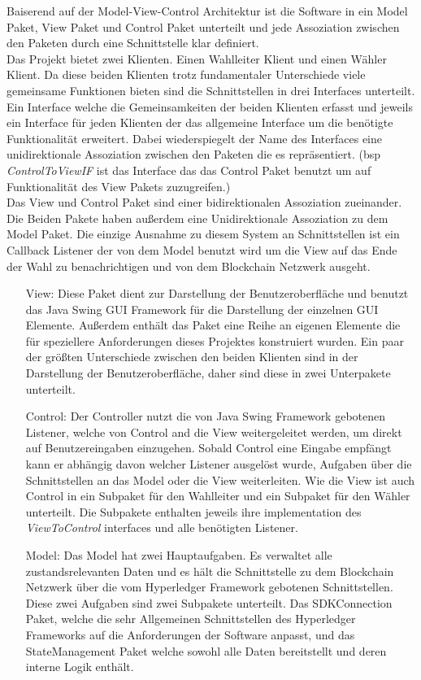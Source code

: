 \documentclass[parskip=full]{scrartcl}
\begin{document}
	Baiserend auf der Model-View-Control Architektur ist die Software in ein Model Paket, View Paket und Control Paket unterteilt und jede Assoziation zwischen den Paketen durch eine Schnittstelle klar definiert. 
	\\
	Das Projekt bietet zwei Klienten. Einen Wahlleiter Klient und einen Wähler Klient. Da diese beiden Klienten trotz fundamentaler Unterschiede viele gemeinsame Funktionen bieten sind die Schnittstellen in drei Interfaces unterteilt. Ein Interface welche die Gemeinsamkeiten der beiden Klienten erfasst und jeweils ein Interface für jeden Klienten der das allgemeine Interface um die benötigte Funktionalität erweitert. Dabei wiederspiegelt der Name des Interfaces eine unidirektionale Assoziation zwischen den Paketen die es repräsentiert. (bsp \textit{ControlToViewIF} ist das Interface das das Control Paket benutzt um auf Funktionalität des View Pakets zuzugreifen.)
	\\
	Das View und Control Paket sind einer bidirektionalen Assoziation zueinander. Die Beiden Pakete haben außerdem eine Unidirektionale Assoziation zu dem Model Paket. Die einzige Ausnahme zu diesem System an Schnittstellen ist ein Callback Listener der von dem Model benutzt wird um die View auf das Ende der Wahl zu benachrichtigen und von dem Blockchain Netzwerk ausgeht.
	\\
	\begin{itemize}
		\item[View:] Diese Paket dient zur Darstellung der Benutzeroberfläche und benutzt das Java Swing GUI Framework für die Darstellung der einzelnen GUI Elemente. Außerdem enthält das Paket eine Reihe an eigenen Elemente die für speziellere Anforderungen dieses Projektes konstruiert wurden. Ein paar der größten Unterschiede zwischen den beiden Klienten sind in der Darstellung der Benutzeroberfläche, daher sind diese in zwei Unterpakete unterteilt.
		\item[Control:] Der Controller nutzt die von Java Swing Framework gebotenen Listener, welche von Control and die View weitergeleitet werden, um direkt auf Benutzereingaben einzugehen. Sobald Control eine Eingabe empfängt kann er abhängig davon welcher Listener ausgelöst wurde, Aufgaben über die Schnittstellen an das Model oder die View weiterleiten. Wie die View ist auch Control in ein Subpaket für den Wahlleiter und ein Subpaket für den Wähler unterteilt. Die Subpakete enthalten jeweils ihre implementation des \textit{ViewToControl} interfaces und alle benötigten Listener.
		\item[Model:] Das Model hat zwei Hauptaufgaben. Es verwaltet alle zustandsrelevanten Daten und es hält die Schnittstelle zu dem Blockchain Netzwerk über die vom Hyperledger Framework gebotenen Schnittstellen. Diese zwei Aufgaben sind zwei Subpakete unterteilt. Das SDKConnection Paket, welche die sehr Allgemeinen Schnittstellen des Hyperledger Frameworks auf die Anforderungen der Software anpasst, und das StateManagement Paket welche sowohl alle Daten bereitstellt und deren interne Logik enthält.   
	\end{itemize} 
		
	\newpage
	
\end{document}
